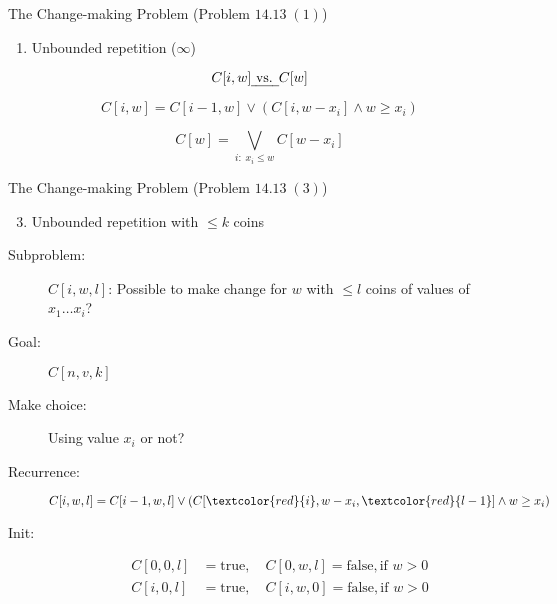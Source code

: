 \begin{frame}{}
  \begin{exampleblock}{The Change-making Problem (Problem $14.13\; (1)$)}
    \begin{enumerate}[(1)]
      \item Unbounded repetition ($\infty$)
    \end{enumerate}
  \end{exampleblock}

  \[
	C[i,w] \text{\emph{ vs. }} C[w]
  \]

  \[
	C[i,w] = C[i-1, w] \lor (C[i, w-x_{i}] \land w \ge x_{i})
  \]

  \[
	C[w] = \bigvee_{i: \; x_i \le w} C[w-x_i]
  \]
\end{frame}
\begin{frame}{}
  \begin{exampleblock}{The Change-making Problem (Problem $14.13\; (3)$)}
    \begin{enumerate}[(1)]
      \setcounter{enumi}{2}
      \item Unbounded repetition with $\le k$ coins
    \end{enumerate}
  \end{exampleblock}

  \pause
  \begin{description}
	\item[Subproblem:] $C[i,w,l]$: Possible to make change for $w$ with $\le l$ coins of values of $x_{1} \dots x_{i}$?
	\item[Goal:] $C[n,v,k]$
	  \pause
	\item[Make choice:] Using value $x_{i}$ or not? 
	\item[Recurrence:] 
	  \[
		C[i,w,l] = C[i-1,w,l] \lor \left( C[\textcolor{red}{i}, w-x_{i}, \textcolor{red}{l-1}] \land w \ge x_{i} \right)
	  \]
	  \pause
	\item[Init:]
	  \begin{align*}
		C[0,0,l] &= \text{true}, \quad C[0,w,l] = \text{false}, \text{if } w > 0 \\
		C[i,0,l] &= \text{true}, \quad C[i,w,0] = \text{false}, \text{if } w > 0
	  \end{align*}
  \end{description}
\end{frame}
